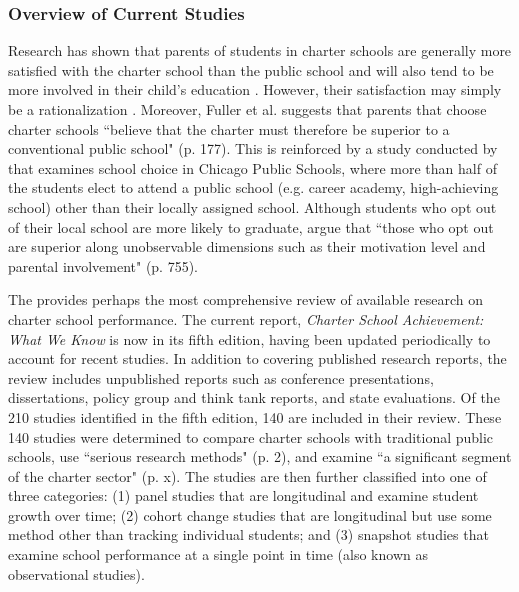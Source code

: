 \documentclass[letterpaper,12p,twoside]{article} %
\begin{document}
\subsubsection{Overview of Current Studies}

Research has shown that parents of students in charter schools are generally more satisfied with the charter school than the public school and will also tend to be more involved in their child's education \cite{TeskeSchneider2001,VanourekMannoFinnBierlein1998}. However, their satisfaction may simply be a rationalization \cite{HubbardKulkarni2009}. Moreover, Fuller et al. \cite<1996, as cited in>{HubbardKulkarni2009} suggests that parents that choose charter schools ``believe that the charter must therefore be superior to a conventional public school" (p. 177). This is reinforced by a study conducted by  that examines school choice in Chicago Public Schools, where more than half of the students elect to attend a public school (e.g. career academy, high-achieving school) other than their locally assigned school. Although students who opt out of their local school are more likely to graduate,  argue that ``those who opt out are superior along unobservable dimensions such as their motivation level and parental involvement" (p. 755). 

The  provides perhaps the most comprehensive review of available research on charter school performance. The current report, \textit{Charter School Achievement: What We Know} is now in its fifth edition, having been updated periodically to account for recent studies. In addition to covering published research reports, the review includes unpublished reports such as conference presentations, dissertations, policy group and think tank reports, and state evaluations. Of the 210 studies identified in the fifth edition, 140 are included in their review. These 140 studies were determined to compare charter schools with traditional public schools, use ``serious research methods" (p. 2), and examine ``a significant segment of the charter sector" (p. x). The studies are then further classified into one of three categories: (1) panel studies that are longitudinal and examine student growth over time; (2) cohort change studies that are longitudinal but use some method other than tracking individual students; and (3) snapshot studies that examine school performance at a single point in time (also known as observational studies).

\end{document}
